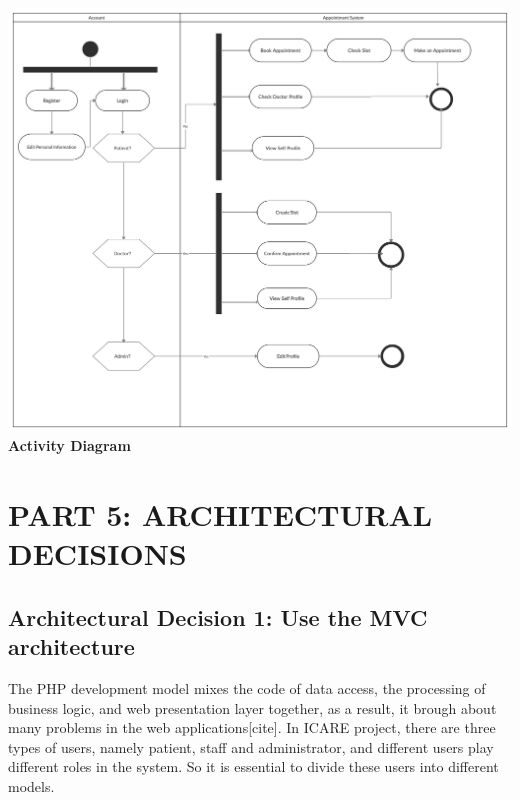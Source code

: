 \documentclass[a4paper,12pt]{report}
\begin{document}
    \begin{center}
        \includegraphics[scale=.1]{UML/activity.png}\\
        \textbf{Activity Diagram}
    \end{center}
    

\chapter*{PART 5: ARCHITECTURAL DECISIONS}

\section*{Architectural Decision 1: Use the MVC architecture}
The PHP development model mixes the code of data access, the processing of business logic, and web presentation layer together, as a result, it brough about many problems in the web applications[cite]. In ICARE project, there are three types of users, namely patient, staff and administrator, and different users play different roles in the system. So it is essential to divide these users into different models. 
\end{document}
